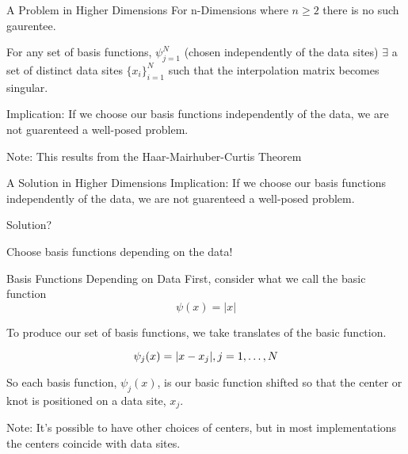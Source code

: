 \documentclass[12pt,t]{beamer}
\newcommand{\subt}[1]{{\footnotesize \color{subtitle} {#1}}}
\begin{document}
\begin{frame}{A Problem in Higher Dimensions}
For n-Dimensions where $n\geq 2$ there is no such gaurentee.
\bigskip

For any set of basis functions, $\psi_{j=1}^N$ (chosen independently of the data sites) $\exists$ a set of distinct data sites $\{x_i\}_{i=1}^N$
such that the interpolation matrix becomes singular. 
\bigskip

\subt{Implication:}
If we choose our basis functions independently of the data, we are not guarenteed a well-posed problem.
\bigskip

\subt{Note:}
This results from the Haar-Mairhuber-Curtis Theorem


\note{}
\end{frame}

\begin{frame}[c]{A Solution in Higher Dimensions}
\subt{Implication:}
If we choose our basis functions independently of the data, we are not guarenteed a well-posed problem.
\bigskip

\subt{Solution?}

Choose basis functions depending on the data!
\bigskip

\note{}
\end{frame}

\begin{frame}{Basis Functions Depending on Data}
First, consider what we call the \subt{basic function}\\
\begin{equation*}
\psi(x)=|x|
\end{equation*}

To produce our set of basis functions, we take translates of the basic function.

\begin{equation*}
\psi_j(x)=|x-x_j|, j=1, \mathellipsis, N
\end{equation*}

So each basis function, $\psi_j(x)$, is our basic function shifted so that the \subt{center} or \subt{knot} is positioned on a data site, $x_j$.
\bigskip

\subt{Note:} It's possible to have other choices of centers, but in most implementations the centers coincide with data sites.

\note{}
\end{frame}
\end{document}
